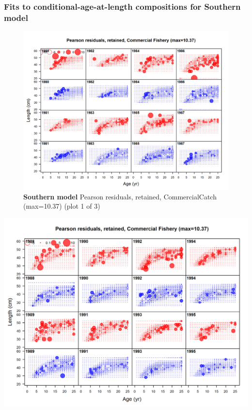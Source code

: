 \documentclass[12pt,]{article}
\begin{document}
\FloatBarrier

\newpage

\subsubsection{Fits to conditional-age-at-length compositions for
Southern
model}\label{fits-to-conditional-age-at-length-compositions-for-southern-model}

\begin{figure}[htbp]
\centering
\includegraphics{./r4ss/plots_mod2/comp_condAALfit_residsflt2mkt2_page1.png}
\caption{\textbf{Southern model} Pearson residuals, retained,
CommercialCatch (max=10.37) (plot 1 of 3)
\label{fig:mod2_1_comp_condAALfit_residsflt2mkt2_page1}}
\end{figure}

\includegraphics{./r4ss/plots_mod2/comp_condAALfit_residsflt2mkt2_page2.png}
\end{document}
